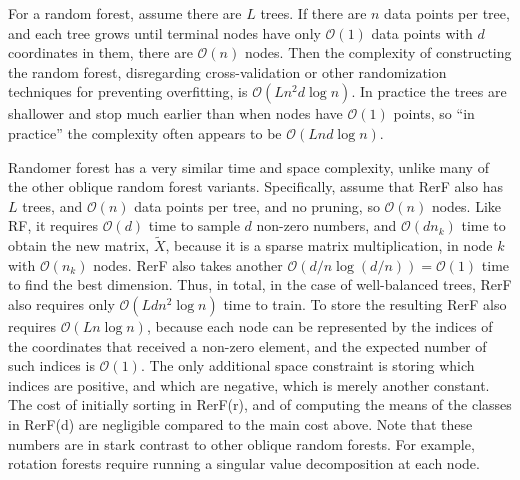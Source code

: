 \documentclass{article} %
\providecommand{\mc}[1]{\mathcal{#1}}
\providecommand{\mt}[1]{\widetilde{#1}}
\begin{document}
For a random forest, assume there are $L$ trees.  
If there are $n$ data points per tree, and each tree grows until terminal nodes have only $\mc O(1)$ data points with $d$ coordinates in them, there are $\mc O(n)$ nodes.
Then the complexity of constructing the random forest, disregarding cross-validation or other randomization techniques for preventing overfitting, is $\mc O(Ln^2d\log n)$. In practice the trees are shallower and stop much earlier than when nodes have $\mc O(1)$ points, so ``in practice'' the complexity often appears to be $\mc O(Lnd\log n)$.

Randomer forest has a very similar time and space complexity, unlike many of the other oblique random forest variants.  Specifically, assume that RerF also has $L$ trees, and $\mc O(n)$ data points per tree, and no pruning, so $\mc O(n)$ nodes. Like RF, it requires $\mc{O}(d)$ time to sample $d$ non-zero numbers, and $\mc{O}(dn_k)$ time to obtain the new matrix, $\mt{X}$, because it is a sparse matrix multiplication, in node $k$ with $\mc O(n_k)$ nodes.  RerF also takes another $\mc{O}(d/n\log(d/n))=\mc O(1)$ time to find the best dimension. Thus, in total, in the case of well-balanced trees, RerF also requires only $\mc{O}(Ldn^2\log n)$ time to train.  To store the resulting RerF also requires $\mc{O}(L n\log n )$, because each node can be represented by the indices of the coordinates that received a non-zero element, and the expected number of such indices is $\mc O(1)$.  The only additional space constraint is storing which indices are positive, and which are negative, which is merely another constant.
The cost of initially sorting in RerF(r), and of computing the means of the classes in RerF(d) are negligible compared to the main cost above. Note that these numbers are in stark contrast to other oblique random forests.  For example, rotation forests require running a singular value decomposition at each node.
\end{document}
